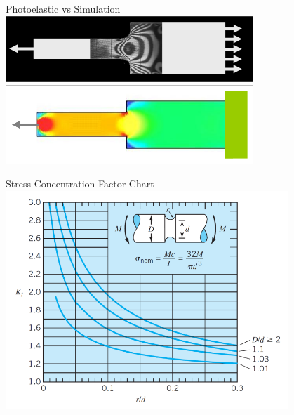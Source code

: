 \documentclass[10pt, svgnames]{beamer}
\begin{document}
\begin{frame}[label={sec:org94d0067}]{Photoelastic vs Simulation}
\centering
\includegraphics[width=0.7\textwidth]{pictures/photoelasticity} \\\empty
\vspace{5mm}
\includegraphics[width=0.7\textwidth]{pictures/simulation}
\end{frame}

\begin{frame}[label={sec:org445ff14}]{Stress Concentration Factor Chart}
\centering
\includegraphics[width=0.8\textwidth]{pictures/stress-conc-grooved-shaft}
\end{frame}
\end{document}
